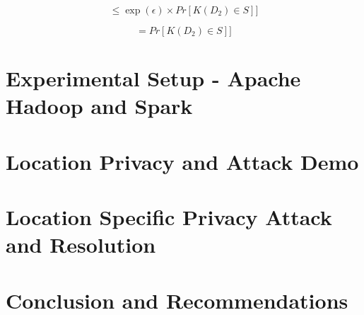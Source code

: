 \documentclass{report}
\begin{document}
\newcommand{\dd}[1]{\mathrm{d}#1}

\begin{equation}
[Pr[\mathit{K}(D_{1})\in S] \leq \exp (\epsilon ) \times Pr[\mathit{K}(D_{2})\in S]] \end{equation}

\begin{equation}
[Pr[\mathit{K}(D_{1})\in S]  = Pr[\mathit{K}(D_{2})\in S]]
\end{equation}


\chapter{Experimental Setup - Apache Hadoop and Spark}




\chapter{Location Privacy and Attack Demo }

\chapter{Location Specific Privacy Attack and Resolution}




\chapter{Conclusion and Recommendations}




\end{document}
